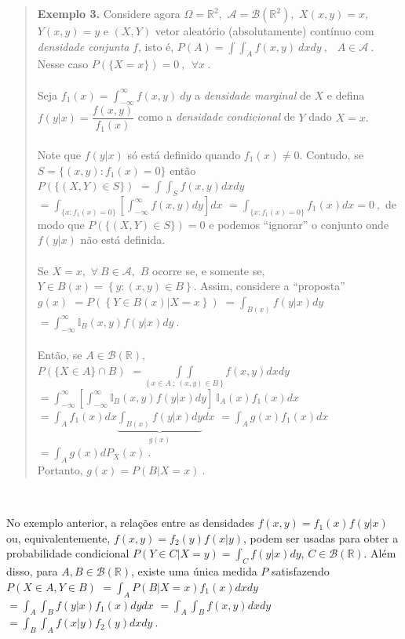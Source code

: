 \documentclass[
]{book}
\begin{document}
\begin{quote}
\textbf{Exemplo 3.} Considere agora \(\Omega=\mathbb{R}^2,\) \(\mathcal{A}= \mathcal{B}\left(\mathbb{R}^2\right),\) \(X(x,y)=x,\) \(Y(x,y)=y\) e \(\left(X,Y\right)\) vetor aleatório (absolutamente) contínuo com \emph{densidade conjunta} \(f\), isto é, \(P(A)=\displaystyle\int \int_A f(x,y)~dxdy~,~~\) \(A \in \mathcal{A}~.\) Nesse caso \(P\left(\{X=x\}\right)=0~,~~ \forall x~.\)\\
\(~\)\\
Seja \(f_1(x)=\displaystyle\int_{-\infty}^{\infty} f(x,y)~dy\) a \emph{densidade marginal} de \(X\) e defina \(f(y|x)=\dfrac{f(x,y)}{f_1(x)}\) como a \emph{densidade condicional} de \(Y\) dado \(X=x.\)\\
\(~\)\\
Note que \(f(y|x)\) só está definido quando \(f_1(x) \neq 0.\) Contudo, se \(S=\{(x,y): f_1(x)=0\}\) então\\
\(P\left(\{(X,Y)\in S\}\right)\)
\(=\displaystyle\int \int_S f(x,y)dxdy\) \(=\displaystyle\int_{\{x:f_1(x)=0\}}\left[\int_{-\infty}^\infty f(x,y)dy\right]dx\)
\(=\displaystyle\int_{\{x:f_1(x)=0\}} f_1(x)dx=0~,\)
de modo que \(P\left(\{(X,Y)\in S\}\right)=0\) e podemos ``ignorar'' o conjunto onde \(f(y|x)\) não está definida.\\
\(~\)\\
Se \(X=x,\) \(\forall~ B \in \mathcal{A},\) \(B\) ocorre se, e somente se, \(Y \in B(x)=\left\{y:(x,y) \in B\right\}.\) Assim, considere a ``proposta''\\
\(g(x)\) \(=P\left(\left\{Y \in B(x)|X=x\right\}\right)\)
\(=\displaystyle\int_{B(x)}f(y|x)dy\)
\(=\displaystyle\int_{-\infty}^\infty \mathbb{I}_B(x,y)f(y|x)dy~.\)\\
\(~\)\\
Então, se \(A \in \mathcal{B}(\mathbb{R}),\)\\
\(P\left(\{X \in A\}\cap B\right)\)
\(=\displaystyle\underset{\left\{x\in A~;~(x,y)\in B\right\}}{\int\int} f(x,y)dxdy\)
\(=\displaystyle\int_{-\infty}^{\infty}\left[\int_{-\infty}^{\infty}\mathbb{I}_B(x,y)f(y|x)dy\right]~\mathbb{I}_A(x)f_1(x)dx\)
\(=\displaystyle\int_Af_1(x)dx\underbrace{\int_{B(x)}f(y|x)dy}_{g(x)}dx\)
\(=\displaystyle\int_Ag(x)f_1(x)dx\)
\(=\displaystyle\int_Ag(x)dP_X(x)~.\)\\
Portanto, \(g(x)=P(B|X=x)~.\)
\end{quote}

\(~\)

No exemplo anterior, a relações entre as densidades \(f(x,y)=f_1(x)f(y|x)\) ou, equivalentemente, \(f(x,y)=f_2(y)f(x|y)\), podem ser usadas para obter a probabilidade condicional \(\displaystyle P(Y\in C|X=y)=\int_C f(y|x)dy\), \(C\in\mathcal{B}(\mathbb{R})\). Além disso, para \(A,B\in\mathcal{B}(\mathbb{R})\), existe uma única medida \(P\) satisfazendo\\
\(P(X\in A,Y \in B)\)
\(=\displaystyle\int_A P(B|X=x) f_1(x)dxdy\)
\(=\displaystyle\int_A \int_Bf(y|x)f_1(x)dydx\)
\(=\displaystyle\int_A \int_B f(x,y)dxdy\)
\(=\displaystyle\int_B \int_Af(x|y)f_2(y)dxdy~.\)
\end{document}
